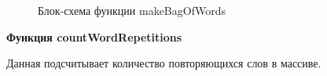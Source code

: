 \documentclass[14pt,a4paper]{extreport}
\begin{document}
    \begin{figure}[h]
    \caption{Блок-схема функции makeBagOfWords}
    \label{ris:image}
    \end{figure}
    \newpage \par \small \textbf{Функция countWordRepetitions}
    \\ \par Данная подсчитывает количество повторяющихся слов в массиве.
\end{document}
